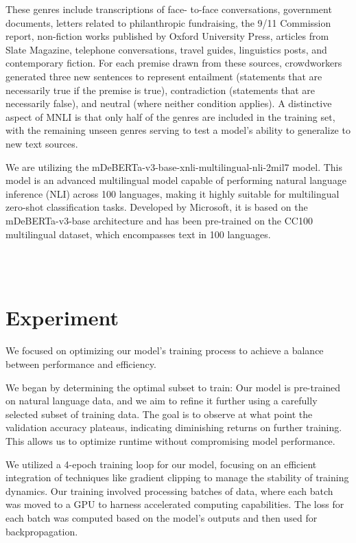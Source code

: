 \documentclass[11pt,a4paper]{article}
\begin{document}
These genres include transcriptions of face- to-face conversations, government documents, letters related to philanthropic fundraising, the 9/11 Commission report, non-fiction works published by Oxford University Press, articles from Slate Magazine, telephone conversations, travel guides, linguistics posts, and contemporary fiction. For each premise drawn from these sources, crowdworkers generated three new sentences to represent entailment (statements that are necessarily true if the premise is true), contradiction (statements that are necessarily false), and neutral (where neither condition applies). A distinctive aspect of MNLI is that only half of the genres are included in the training set, with the remaining unseen genres serving to test a model's ability to generalize to new text sources.

We are utilizing the mDeBERTa-v3-base-xnli-multilingual-nli-2mil7 model. This model is an advanced multilingual model capable of performing natural language inference (NLI) across 100 languages, making it highly suitable for multilingual zero-shot classification tasks. Developed by Microsoft, it is based on the mDeBERTa-v3-base architecture and has been pre-trained on the CC100 multilingual dataset, which encompasses text in 100 languages.

\\~\\

\section{Experiment}
We focused on optimizing our model's training process to achieve a balance between performance and efficiency. 

We began by determining the optimal subset to train: Our model is pre-trained on natural language data, and we aim to refine it further using a carefully selected subset of training data. The goal is to observe at what point the validation accuracy plateaus, indicating diminishing returns on further training. This allows us to optimize runtime without compromising model performance.

We utilized a 4-epoch training loop for our model, focusing on an efficient integration of techniques like gradient clipping to manage the stability of training dynamics. Our training involved processing batches of data, where each batch was moved to a GPU to harness accelerated computing capabilities. The loss for each batch was computed based on the model's outputs and then used for backpropagation.
\end{document}
